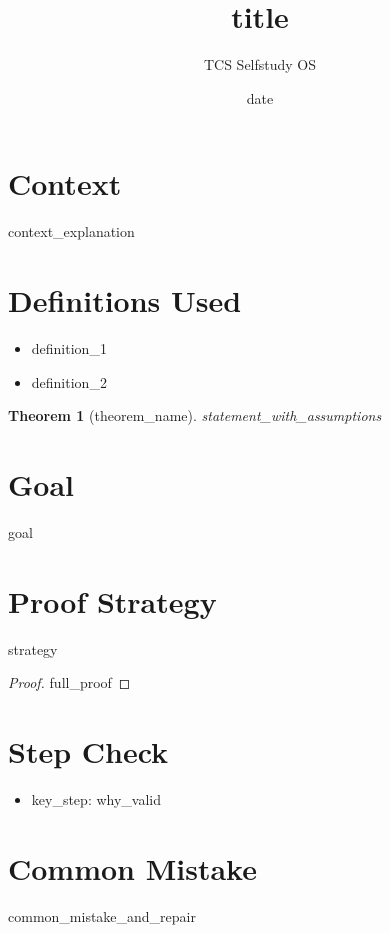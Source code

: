 \documentclass[11pt]{article}
\title{{{title}}}
\author{TCS Selfstudy OS}
\date{{{date}}}
\newtheorem{theorem}{Theorem}
\begin{document}
\maketitle

\section*{Context}

{{context_explanation}}

\section*{Definitions Used}

\begin{itemize}
  \item {{definition_1}}
  \item {{definition_2}}
\end{itemize}

\begin{theorem}[{{theorem_name}}]
{{statement_with_assumptions}}
\end{theorem}

\section*{Goal}

{{goal}}

\section*{Proof Strategy}

{{strategy}}

\begin{proof}
{{full_proof}}
\end{proof}

\section*{Step Check}

\begin{itemize}
  \item {{key_step}}: {{why_valid}}
\end{itemize}

\section*{Common Mistake}

{{common_mistake_and_repair}}
\end{document}
